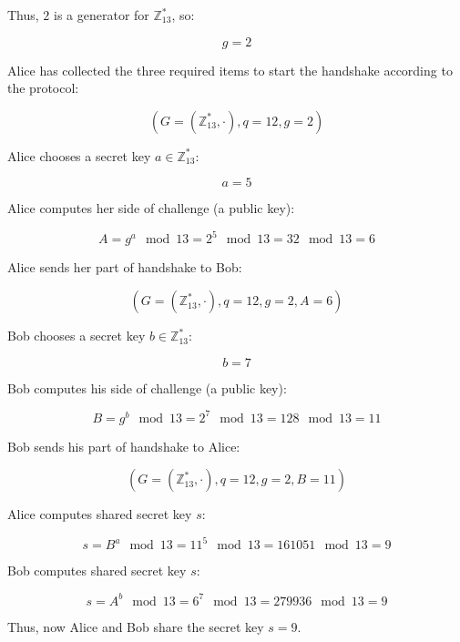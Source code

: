 Thus, $2$ is a generator for $\mathbb{Z}_{13}^*$, so:

\begin{equation}
    g = 2
\end{equation}

Alice has collected the three required items to start the handshake according to the protocol:

\begin{equation}
    (G = (\mathbb{Z}_{13}^*, \cdot), q = 12, g = 2)
\end{equation}

Alice chooses a secret key $a \in \mathbb{Z}_{13}^*$:

\begin{equation}
    a = 5
\end{equation}

Alice computes her side of challenge (a public key): 

\begin{equation}
    A = g^a \mod 13 = 2^5 \mod 13 = 32 \mod 13 = 6
\end{equation}

Alice sends her part of handshake to Bob: 

\begin{equation}
    (G = (\mathbb{Z}_{13}^*, \cdot), q = 12, g = 2, A = 6)
\end{equation}

Bob chooses a secret key $b \in \mathbb{Z}_{13}^*$:

\begin{equation}
    b = 7
\end{equation}

Bob computes his side of challenge (a public key):

\begin{equation}
    B = g^b \mod 13 = 2^7 \mod 13 = 128 \mod 13 = 11
\end{equation}

Bob sends his part of handshake to Alice:

\begin{equation}
    (G = (\mathbb{Z}_{13}^*, \cdot), q = 12, g = 2, B = 11)
\end{equation}

Alice computes shared secret key $s$:

\begin{equation}
    s = B^a \mod 13 = 11^5 \mod 13 = 161051 \mod 13 = 9
\end{equation}

Bob computes shared secret key $s$:

\begin{equation}
    s = A^b \mod 13 = 6^7 \mod 13 = 279936 \mod 13 = 9
\end{equation}

Thus, now Alice and Bob share the secret key $s = 9$.
